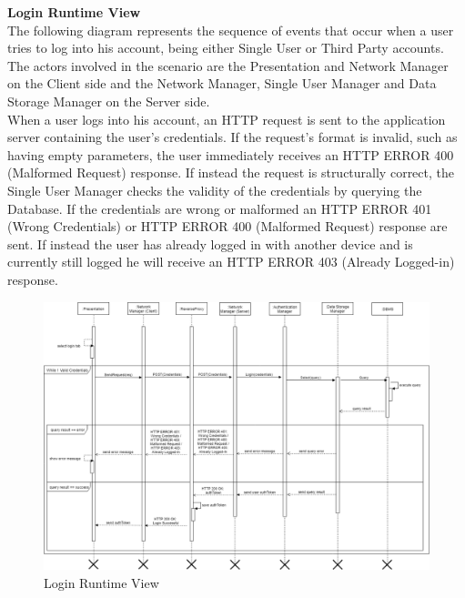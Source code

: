 \documentclass[titlepage]{article}
\begin{document}
{\bf Login Runtime View }\\ 
The following diagram represents the sequence of events that occur when a user tries to log into his account, being either Single User or Third Party accounts. The actors involved in the scenario are the Presentation and Network Manager on the Client side and the Network Manager, Single User Manager and Data Storage Manager on the Server side. \\
When a user logs into his account, an HTTP request is sent to the application server containing the user’s credentials. If the request’s format is invalid, such as having empty parameters, the user immediately receives an HTTP ERROR 400 (Malformed Request) response. If instead the request is structurally correct, the Single User Manager checks the validity of the credentials by querying the Database. If the credentials are wrong or malformed an HTTP ERROR 401 (Wrong Credentials) or HTTP ERROR 400 (Malformed Request) response are sent. If instead the user has already logged in with another device and is currently still logged he will receive an HTTP ERROR 403 (Already Logged-in) response.\\

\begin{figure}[H]
	\center
  	\includegraphics[width=15cm]{Login.png}
  	\caption{Login Runtime View}
 	\label{fig:LOG}
\end{figure}
\end{document}
